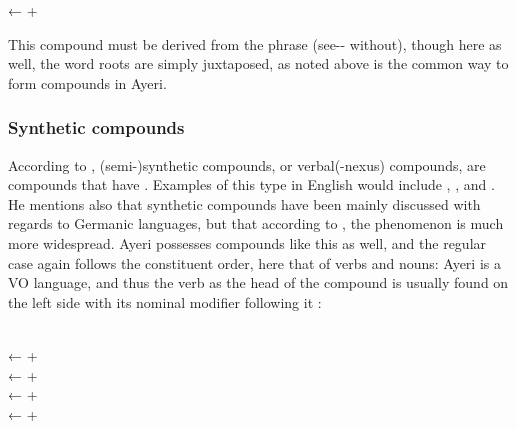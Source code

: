 \ex
	← 
	+ 
\xe

This compound must be derived from the phrase  (see-\Nmlz{}-\Loc{} without), though here as well, the 
word roots are simply juxtaposed, as noted above is the common way to form 
compounds in Ayeri.


\subsubsection{Synthetic compounds}

According to \citet{bauer2001}, (semi-)synthetic compounds, or verbal(-nexus)
compounds, are compounds that have . Examples of this type in English would include
, , and . He mentions also 
that synthetic compounds have been mainly discussed with regards to Germanic
languages, but that according to \citet[3608]{lieber1994}, the phenomenon is
much more widespread. Ayeri possesses compounds like this as well, and the
regular case again follows the constituent order, here that of verbs and nouns:
Ayeri is a VO language, and thus the verb as the head of the compound is
usually found on the left side with its nominal modifier following it
\citep[compare][129--133]{gaeta2008}:

\pex
	\a {} \\
		← 
		+ 
	\a {} \\
		← 
		+ 
	\a {} \\
		← 
		+ 
	\a {} \\
		← 
		+ 
\xe

